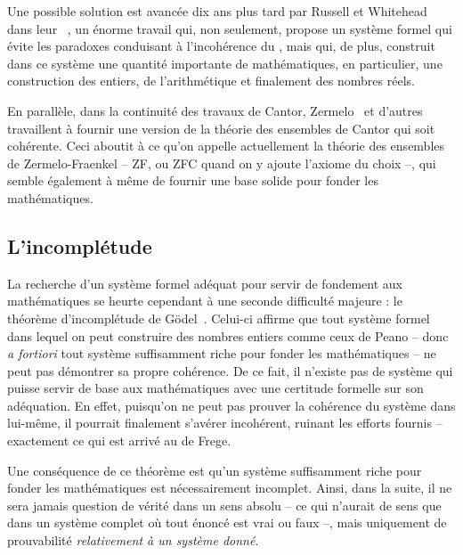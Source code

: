 Une possible solution est avancée dix ans plus tard
par Russell et Whitehead dans leur ~,
un énorme travail qui, non seulement, propose un système
formel qui évite les paradoxes conduisant à l’incohérence du
, mais qui, de plus, construit
dans ce système une quantité importante de mathématiques,
en particulier, une construction des entiers, de l’arithmétique et
finalement des nombres réels.

En parallèle, dans la continuité des travaux de Cantor,
Zermelo~ et
d’autres travaillent à fournir une version de la théorie des ensembles de Cantor
qui soit cohérente. Ceci aboutit à ce qu’on appelle actuellement la
théorie des ensembles de Zermelo-Fraenkel – ZF, ou ZFC quand on y ajoute l’axiome
du choix %
–, qui semble également à même de fournir une base solide pour fonder les
mathématiques.

\subsection{L’incomplétude}

La recherche d’un système formel adéquat pour servir de fondement aux mathématiques 
se heurte cependant à une seconde difficulté majeure : le théorème d’incomplétude de
Gödel~. Celui-ci affirme que tout système formel
dans lequel on peut construire des nombres entiers comme ceux de Peano – donc
\textit{a fortiori} tout système suffisamment riche pour fonder les mathématiques –
ne peut pas démontrer sa propre cohérence. De ce fait, il n’existe pas de
système qui puisse servir de base aux mathématiques
avec une certitude formelle sur son adéquation.
En effet, puisqu’on ne peut pas prouver la cohérence du
système dans lui-même, il pourrait finalement s’avérer incohérent, ruinant les
efforts fournis – exactement ce qui est arrivé au  de Frege.

Une conséquence de ce théorème est qu’un système suffisamment riche
pour fonder les mathématiques est nécessairement incomplet.%
Ainsi, dans la suite, il ne sera jamais question de vérité dans un sens absolu –
ce qui n’aurait de sens que dans un système complet
où tout énoncé est vrai ou faux –, mais
uniquement de prouvabilité \emph{relativement à un système donné}.

